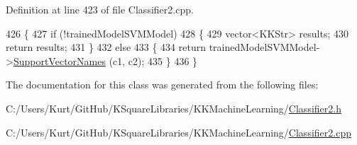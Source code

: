Definition at line 423 of file Classifier2.\+cpp.


\begin{DoxyCode}
426 \{
427   \textcolor{keywordflow}{if}  (!trainedModelSVMModel)
428   \{
429     vector<KKStr>  results;
430     \textcolor{keywordflow}{return}  results;
431   \}
432   \textcolor{keywordflow}{else}
433   \{
434     \textcolor{keywordflow}{return}  trainedModelSVMModel->\hyperlink{class_k_k_m_l_l_1_1_s_v_m_model_a21df134c13366bf28399f7e8e0187ab9}{SupportVectorNames} (c1, c2);
435   \}
436 \}
\end{DoxyCode}


The documentation for this class was generated from the following files\+:\begin{DoxyCompactItemize}
\item 
C\+:/\+Users/\+Kurt/\+Git\+Hub/\+K\+Square\+Libraries/\+K\+K\+Machine\+Learning/\hyperlink{_classifier2_8h}{Classifier2.\+h}\item 
C\+:/\+Users/\+Kurt/\+Git\+Hub/\+K\+Square\+Libraries/\+K\+K\+Machine\+Learning/\hyperlink{_classifier2_8cpp}{Classifier2.\+cpp}\end{DoxyCompactItemize}
